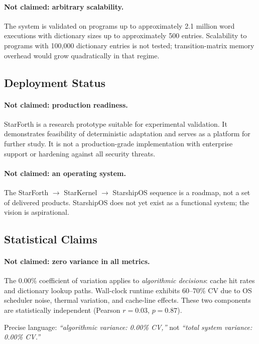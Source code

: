 \paragraph{Not claimed: arbitrary scalability.}
The system is validated on programs up to approximately 2.1 million word
executions with dictionary sizes up to approximately 500 entries. Scalability
to programs with 100{,}000\raisebox{0.5ex}{+} dictionary entries is not
tested; transition-matrix memory overhead would grow quadratically in that
regime.

\subsection{Deployment Status}

\paragraph{Not claimed: production readiness.}
StarForth is a research prototype suitable for experimental validation. It
demonstrates feasibility of deterministic adaptation and serves as a platform
for further study. It is not a production-grade implementation with enterprise
support or hardening against all security threats.

\paragraph{Not claimed: an operating system.}
The StarForth $\to$ StarKernel $\to$ StarshipOS sequence is a roadmap, not a
set of delivered products. StarshipOS does not yet exist as a functional
system; the vision is aspirational.

\subsection{Statistical Claims}

\paragraph{Not claimed: zero variance in all metrics.}
The 0.00\% coefficient of variation applies to \emph{algorithmic decisions}:
cache hit rates and dictionary lookup paths. Wall-clock runtime exhibits
60--70\% CV due to OS scheduler noise, thermal variation, and cache-line
effects. These two components are statistically independent (Pearson
$r = 0.03$, $p = 0.87$).

Precise language: \emph{``algorithmic variance: 0.00\% CV,''} not
\emph{``total system variance: 0.00\% CV.''}

